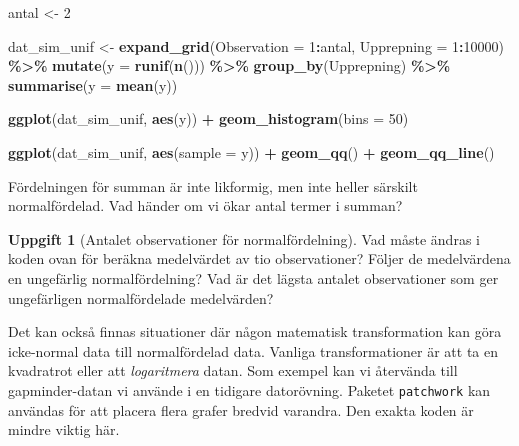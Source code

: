 \documentclass[
]{book}
\newenvironment{Shaded}{\begin{snugshade}}{\end{snugshade}}
\newcommand{\AttributeTok}[1]{\textcolor[rgb]{0.13,0.29,0.53}{#1}}
\newcommand{\DecValTok}[1]{\textcolor[rgb]{0.00,0.00,0.81}{#1}}
\newcommand{\FunctionTok}[1]{\textcolor[rgb]{0.13,0.29,0.53}{\textbf{#1}}}
\newcommand{\NormalTok}[1]{#1}
\newcommand{\OtherTok}[1]{\textcolor[rgb]{0.56,0.35,0.01}{#1}}
\newcommand{\SpecialCharTok}[1]{\textcolor[rgb]{0.81,0.36,0.00}{\textbf{#1}}}
\theoremstyle{definition}
\theoremstyle{definition}
\theoremstyle{definition}
\newtheorem{exercise}{Uppgift}[chapter]
\theoremstyle{definition}
\theoremstyle{remark}
\begin{document}
\begin{Shaded}
\begin{Highlighting}[]
\NormalTok{antal }\OtherTok{\textless{}{-}} \DecValTok{2}

\NormalTok{dat\_sim\_unif }\OtherTok{\textless{}{-}} \FunctionTok{expand\_grid}\NormalTok{(}\AttributeTok{Observation =} \DecValTok{1}\SpecialCharTok{:}\NormalTok{antal, }
                            \AttributeTok{Upprepning =} \DecValTok{1}\SpecialCharTok{:}\DecValTok{10000}\NormalTok{) }\SpecialCharTok{\%\textgreater{}\%} 
  \FunctionTok{mutate}\NormalTok{(}\AttributeTok{y =} \FunctionTok{runif}\NormalTok{(}\FunctionTok{n}\NormalTok{())) }\SpecialCharTok{\%\textgreater{}\%} 
  \FunctionTok{group\_by}\NormalTok{(Upprepning) }\SpecialCharTok{\%\textgreater{}\%} 
  \FunctionTok{summarise}\NormalTok{(}\AttributeTok{y =} \FunctionTok{mean}\NormalTok{(y))}

\FunctionTok{ggplot}\NormalTok{(dat\_sim\_unif, }\FunctionTok{aes}\NormalTok{(y)) }\SpecialCharTok{+} \FunctionTok{geom\_histogram}\NormalTok{(}\AttributeTok{bins =} \DecValTok{50}\NormalTok{)}
\end{Highlighting}
\end{Shaded}

\begin{Shaded}
\begin{Highlighting}[]
\FunctionTok{ggplot}\NormalTok{(dat\_sim\_unif, }\FunctionTok{aes}\NormalTok{(}\AttributeTok{sample =}\NormalTok{ y)) }\SpecialCharTok{+} 
  \FunctionTok{geom\_qq}\NormalTok{() }\SpecialCharTok{+} \FunctionTok{geom\_qq\_line}\NormalTok{()}
\end{Highlighting}
\end{Shaded}

Fördelningen för summan är inte likformig, men inte heller särskilt normalfördelad. Vad händer om vi ökar antal termer i summan?

\begin{exercise}[Antalet observationer för normalfördelning]
Vad måste ändras i koden ovan för beräkna medelvärdet av tio observationer? Följer de medelvärdena en ungefärlig normalfördelning? Vad är det lägsta antalet observationer som ger ungefärligen normalfördelade medelvärden?
\end{exercise}

Det kan också finnas situationer där någon matematisk transformation kan göra icke-normal data till normalfördelad data. Vanliga transformationer är att ta en kvadratrot eller att \emph{logaritmera} datan. Som exempel kan vi återvända till gapminder-datan vi använde i en tidigare datorövning. Paketet \texttt{patchwork} kan användas för att placera flera grafer bredvid varandra. Den exakta koden är mindre viktig här.
\end{document}

